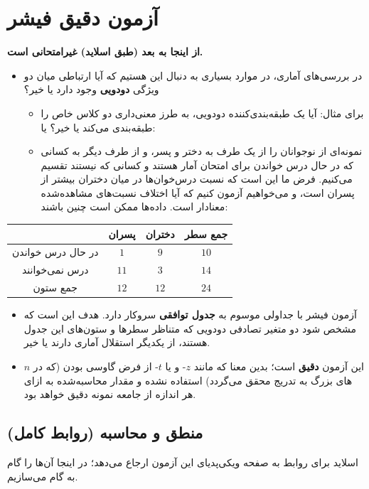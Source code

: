 \section{آزمون دقیق فیشر }
\textbf{از اینجا به بعد (طبق اسلاید) غیرامتحانی است.}

\begin{itemize}
\item در بررسی‌های آماری، در موارد بسیاری به دنبال این هستیم که آیا ارتباطی میان دو ویژگی \textbf{دودویی} وجود دارد یا خیر؟
\begin{itemize}
\item برای مثال: آیا یک طبقه‌بندی‌کننده دودویی، به طرز معنی‌داری دو کلاس خاص را طبقه‌بندی می‌کند یا خیر؟ یا:
\item نمونه‌ای از نوجوانان را از یک طرف به دختر و پسر، و از طرف دیگر به کسانی که در حال درس خواندن برای امتحان آمار هستند و کسانی که نیستند تقسیم می‌کنیم. فرض ما این است که نسبت درس‌خوان‌ها در میان دختران بیشتر از پسران است، و می‌خواهیم آزمون کنیم که آیا اختلاف نسبت‌های مشاهده‌شده معنادار است. داده‌ها ممکن است چنین باشند:
\end{itemize}
\end{itemize}

\begin{center}
\renewcommand{\arraystretch}{1.4}
\begin{tabular}{c|c|c|c}
& پسران & دختران & جمع سطر\\\hline
در حال درس خواندن & $1$ & $9$ & $10$\\
درس نمی‌خوانند & $11$ & $3$ & $14$\\\hline
جمع ستون & $12$ & $12$ & $24$
\end{tabular}
\end{center}

\begin{itemize}
\item آزمون فیشر با جداولی موسوم به \textbf{جدول توافقی } سروکار دارد. هدف این است که مشخص شود دو متغیر تصادفی دودویی که متناظر سطرها و ستون‌های این جدول هستند، از یکدیگر استقلال آماری دارند یا خیر.
\item این آزمون \textbf{دقیق } است؛ بدین معنا که مانند $z$- و یا $t$- از فرض گاوسی بودن (که در $n$های بزرگ به تدریج محقق می‌گردد) استفاده نشده و مقدار  محاسبه‌شده به ازای هر اندازه از جامعه نمونه دقیق خواهد بود.
\end{itemize}

\subsection{منطق و محاسبه (روابط کامل)}
اسلاید برای روابط به صفحه ویکی‌پدیای این آزمون ارجاع می‌دهد؛ در اینجا آن‌ها را گام به گام می‌سازیم.

